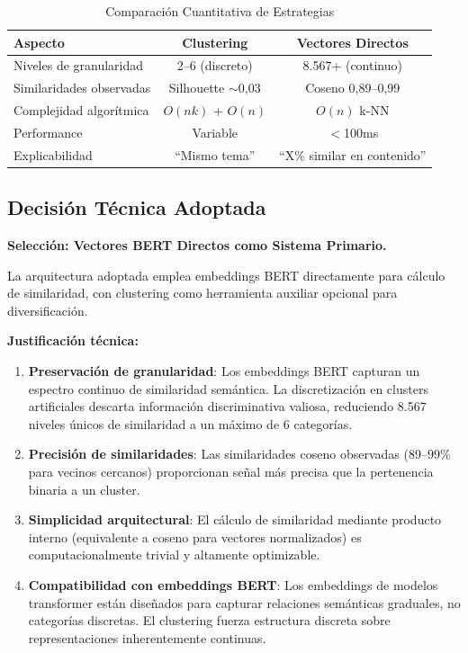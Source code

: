 \begin{table}[htbp]
\centering
\caption{Comparación Cuantitativa de Estrategias}
\label{tab:comparacion-estrategias}
\begin{tabular}{lcc}
\toprule
\textbf{Aspecto} & \textbf{Clustering} & \textbf{Vectores Directos} \\
\midrule
Niveles de granularidad & 2--6 (discreto) & 8.567+ (continuo) \\
Similaridades observadas & Silhouette $\sim$0,03 & Coseno 0,89--0,99 \\
Complejidad algorítmica & $O(nk)$ + $O(n)$ & $O(n)$ k-NN \\
Performance & Variable & $<$100ms \\
Explicabilidad & ``Mismo tema'' & ``X\% similar en contenido'' \\
\bottomrule
\end{tabular}
\end{table}

\subsection{Decisión Técnica Adoptada}
\label{subsec:decision-tecnica}

\textbf{Selección: Vectores BERT Directos como Sistema Primario.}

La arquitectura adoptada emplea embeddings BERT directamente para cálculo de similaridad, con clustering como herramienta auxiliar opcional para diversificación.

\textbf{Justificación técnica:}

\begin{enumerate}
    \item \textbf{Preservación de granularidad}: Los embeddings BERT capturan un espectro continuo de similaridad semántica. La discretización en clusters artificiales descarta información discriminativa valiosa, reduciendo 8.567 niveles únicos de similaridad a un máximo de 6 categorías.

    \item \textbf{Precisión de similaridades}: Las similaridades coseno observadas (89--99\% para vecinos cercanos) proporcionan señal más precisa que la pertenencia binaria a un cluster.

    \item \textbf{Simplicidad arquitectural}: El cálculo de similaridad mediante producto interno (equivalente a coseno para vectores normalizados) es computacionalmente trivial y altamente optimizable.

    \item \textbf{Compatibilidad con embeddings BERT}: Los embeddings de modelos transformer están diseñados para capturar relaciones semánticas graduales, no categorías discretas. El clustering fuerza estructura discreta sobre representaciones inherentemente continuas.
\end{enumerate}

